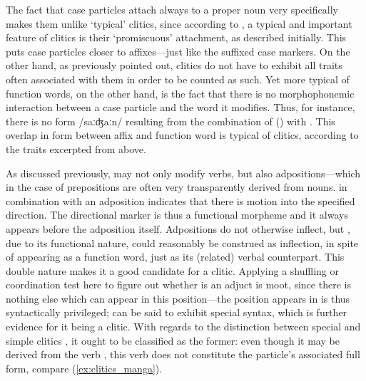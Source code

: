 The fact that case particles attach always to a proper noun very specifically
makes them unlike `typical' clitics, since according to
\citet{spencerluis2012}, a typical and important feature of clitics is their
`promiscuous' attachment, as described initially. This puts case particles
closer to affixes---just like the suffixed case markers. On the other hand, as
previously pointed out, clitics do not have to exhibit all traits often
associated with them in order to be counted as such. Yet more typical of
function words, on the other hand, is the fact that there is no morphophonemic
interaction between a case particle and the word it modifies. Thus, for
instance, there is no form /saːʤaːn/ resulting from the combination of
 (\Parg{}) with . This overlap in form between
affix and function word is typical of clitics, according to the traits
excerpted from \citet{spencerluis2012} above.

\label{clitics_prep_dyn}
As discussed previously,  may not only modify verbs, but also
ad\-posi\-tions---which in the case of prepositions are often very
transparently derived from nouns.  in combination with an
adposition indicates that there is motion into the
specified direction. The directional marker  is thus a
functional morpheme and it always appears before the adposition itself.
Adpositions do not otherwise inflect, but , due to its
functional nature, could reasonably be construed as inflection, in spite of
appearing as a function word, just as its (related) verbal counterpart. This
double nature makes it a good candidate for a clitic. Applying a shuffling or
coordination test here to figure out whether  is an adjuct is
moot, since there is nothing else which can appear in this position---the
position  appears in is thus syntactically privileged;
 can be said to exhibit special syntax, which is further
evidence for it being a clitic. With regards to the distinction between special
and simple clitics \citep{zwicky1977}, it ought to be classified as the former:
even though it may be derived from the verb , this
verb does not constitute the particle's associated full form, compare 
(\ref{ex:clitics_manga}).

